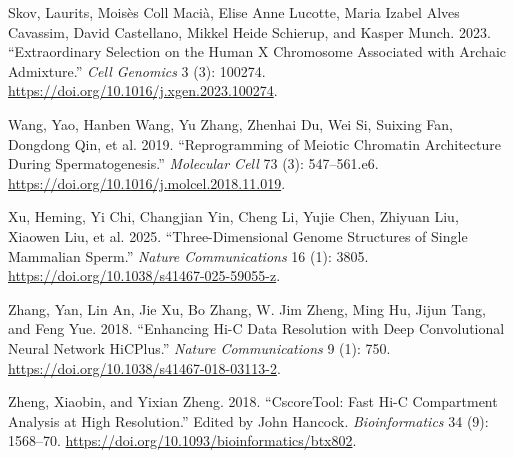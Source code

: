 \documentclass[
  10pt,
  a4paper,
  openany]{scrbook}
\newlength{\cslhangindent}
\newenvironment{CSLReferences}[2] %
 {\begin{list}{}{%
  \setlength{\itemindent}{0pt}
  \setlength{\leftmargin}{0pt}
  \setlength{\parsep}{0pt}
  \ifodd #1
   \setlength{\leftmargin}{\cslhangindent}
   \setlength{\itemindent}{-1\cslhangindent}
  \fi
  \setlength{\itemsep}{#2\baselineskip}}}
 {\end{list}}
\begin{document}
\begin{CSLReferences}{1}{0}
Skov, Laurits, Moisès Coll Macià, Elise Anne Lucotte, Maria Izabel Alves
Cavassim, David Castellano, Mikkel Heide Schierup, and Kasper Munch.
2023. {``Extraordinary Selection on the Human {X} Chromosome Associated
with Archaic Admixture.''} \emph{Cell Genomics} 3 (3): 100274.
\url{https://doi.org/10.1016/j.xgen.2023.100274}.

Wang, Yao, Hanben Wang, Yu Zhang, Zhenhai Du, Wei Si, Suixing Fan,
Dongdong Qin, et al. 2019. {``Reprogramming of {Meiotic Chromatin
Architecture} During {Spermatogenesis}.''} \emph{Molecular Cell} 73 (3):
547--561.e6. \url{https://doi.org/10.1016/j.molcel.2018.11.019}.

Xu, Heming, Yi Chi, Changjian Yin, Cheng Li, Yujie Chen, Zhiyuan Liu,
Xiaowen Liu, et al. 2025. {``Three-Dimensional Genome Structures of
Single Mammalian Sperm.''} \emph{Nature Communications} 16 (1): 3805.
\url{https://doi.org/10.1038/s41467-025-59055-z}.

Zhang, Yan, Lin An, Jie Xu, Bo Zhang, W. Jim Zheng, Ming Hu, Jijun Tang,
and Feng Yue. 2018. {``Enhancing {Hi-C} Data Resolution with Deep
Convolutional Neural Network {HiCPlus}.''} \emph{Nature Communications}
9 (1): 750. \url{https://doi.org/10.1038/s41467-018-03113-2}.

Zheng, Xiaobin, and Yixian Zheng. 2018. {``{CscoreTool}: Fast {Hi-C}
Compartment Analysis at High Resolution.''} Edited by John Hancock.
\emph{Bioinformatics} 34 (9): 1568--70.
\url{https://doi.org/10.1093/bioinformatics/btx802}.

\end{CSLReferences}


\backmatter
\end{document}
